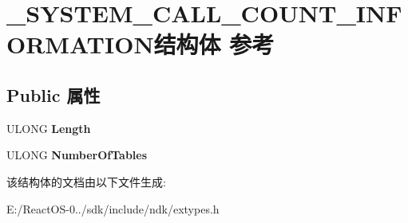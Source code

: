 \hypertarget{struct___s_y_s_t_e_m___c_a_l_l___c_o_u_n_t___i_n_f_o_r_m_a_t_i_o_n}{}\section{\+\_\+\+S\+Y\+S\+T\+E\+M\+\_\+\+C\+A\+L\+L\+\_\+\+C\+O\+U\+N\+T\+\_\+\+I\+N\+F\+O\+R\+M\+A\+T\+I\+O\+N结构体 参考}
\label{struct___s_y_s_t_e_m___c_a_l_l___c_o_u_n_t___i_n_f_o_r_m_a_t_i_o_n}
\subsection*{Public 属性}
\begin{DoxyCompactItemize}
\item 
\mbox{\label{struct___s_y_s_t_e_m___c_a_l_l___c_o_u_n_t___i_n_f_o_r_m_a_t_i_o_n_a6a52ca519ed5928c2e62c51561ca7f2a}} 
U\+L\+O\+NG {\bfseries Length}
\item 
\mbox{\label{struct___s_y_s_t_e_m___c_a_l_l___c_o_u_n_t___i_n_f_o_r_m_a_t_i_o_n_a0310de6c9a7964ca2fcccbc07f8d831c}} 
U\+L\+O\+NG {\bfseries Number\+Of\+Tables}
\end{DoxyCompactItemize}


该结构体的文档由以下文件生成\+:\begin{DoxyCompactItemize}
\item 
E\+:/\+React\+O\+S-\/0../sdk/include/ndk/extypes.\+h\end{DoxyCompactItemize}
